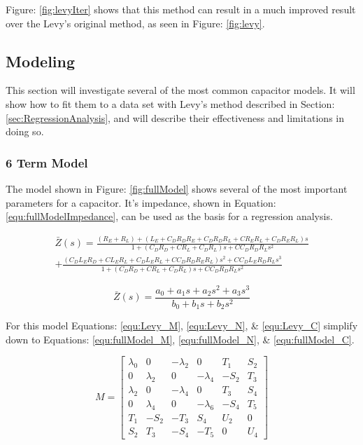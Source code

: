 Figure: \ref{fig:levyIter} shows that this method can result in a much improved result over the Levy's original method, as seen in Figure: \ref{fig:levy}.




\subsection{Modeling}
This section will investigate several of the most common capacitor models. It will show how to fit them to a data set with Levy's method described in Section: \ref{sec:RegressionAnalysis}, and will describe their effectiveness and limitations in doing so.

\subsubsection{6 Term Model}


The model shown in Figure: \ref{fig:fullModel} shows several of the most important parameters for a capacitor. It's impedance, shown in Equation: \eqref{equ:fullModelImpedance}, can be used as the basis for a regression analysis.

\begin{equation}
\begin{split}
\label{equ:fullModelImpedance}
\bar{Z}(s) = \frac{(R_E + R_L) + (L_E + C_DR_DR_E + C_DR_DR_L + CR_ER_L + C_DR_ER_L)s}{1 + (C_DR_D + CR_L + C_DR_L)s + CC_DR_DR_Ls^2} \\ 
+ \frac{(C_DL_ER_D + CL_ER_L + C_DL_ER_L + CC_DR_DR_ER_L)s^2 + CC_DL_ER_DR_Ls^3}{1 + (C_DR_D + CR_L + C_DR_L)s + CC_DR_DR_Ls^2}
\end{split}
\end{equation}

\begin{equation}
\label{equ:fullModelPoly}
\bar{Z}(s) = \frac{a_0 + a_1s + a_2s^2 + a_3s^3}{b_0 + b_1s + b_2s^2}
\end{equation}


For this model Equations: \eqref{equ:Levy_M}, \eqref{equ:Levy_N}, \& \eqref{equ:Levy_C} simplify down to Equations: \eqref{equ:fullModel_M}, \eqref{equ:fullModel_N}, \& \eqref{equ:fullModel_C}.

\begin{equation}
\label{equ:fullModel_M}
M = 
\begin{bmatrix}
\lambda _0 & 0          & -\lambda _2 & 0           &  T_1    & S_2 \\
0          & \lambda _2 & 0           & -\lambda _4 & -S_2    & T_3 \\
\lambda _2 & 0          & -\lambda _4 & 0           &  T_3    & S_4 \\
0          & \lambda _4 & 0           & -\lambda _6 & -S_4    & T_5 \\
T_1        & -S_2       & -T_3        &  S_4        &  U_2    & 0   \\
S_2        &  T_3       & -S_4        & -T_5        &  0      & U_4
\end{bmatrix}
\end{equation}

